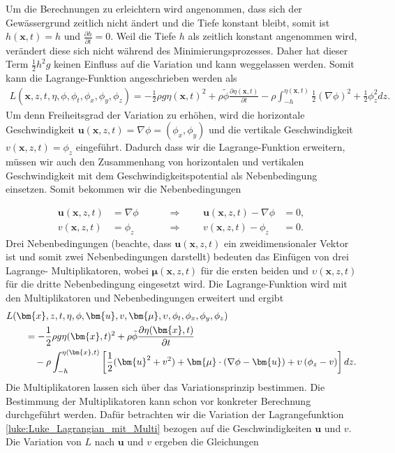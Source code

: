 Um die Berechnungen zu erleichtern wird angenommen, dass sich der Gewässergrund zeitlich nicht ändert und die Tiefe konstant bleibt, somit ist $h(\bm{x},t) = h$ und $\frac{\partial h}{\partial t} = 0$.
Weil die Tiefe $h$ als zeitlich konstant angenommen wird, verändert diese sich nicht während des Minimierungsprozesses.
Daher hat dieser Term $\frac{1}{2}h^2g$ keinen Einfluss auf die Variation und kann weggelassen werden.
Somit kann die Lagrange-Funktion angeschrieben werden als
\begin{align}
	L(\bm{x},z,t,\eta,\phi,\phi_t,\phi_x, \phi_y, \phi_z)
	= 
	-\frac{1}{2}\rho g\eta(\bm{x},t)^2 +\rho \tilde{\phi} \frac{\partial\eta(\bm{x},t)}{\partial t} -\rho \int_{-h}^{\eta(\bm{x},t)} \frac{1}{2}\left(\nabla\phi\right)^2 + \frac{1}{2}\phi_z^2 dz
	.
	\nonumber
\end{align}
Um denn Freiheitsgrad der Variation zu erhöhen, wird die horizontale Geschwindigkeit $\bm{u}(\bm{x},z,t) = \nabla\phi = (\phi_x, \phi_y)$ und die vertikale Geschwindigkeit $v(\bm{x},z,t) = \phi_z$ eingeführt. 
Dadurch dass wir die Lagrange-Funktion erweitern, müssen wir auch den Zusammenhang von horizontalen und vertikalen Geschwindigkeit mit dem Geschwindigkeitspotential als Nebenbedingung einsetzen.
Somit bekommen wir die Nebenbedingungen

\begin{align}
	\bm{u}(\bm{x},z,t)
	&=
	\nabla\phi
	&&&&\Rightarrow&&&
	\bm{u}(\bm{x},z,t)
	-
	\nabla\phi
	&=
	0,
	\nonumber
	\\
	v(\bm{x},z,t)
	&=
	\phi_z
	&&&&\Rightarrow&&&
	v(\bm{x},z,t)
	-
	\phi_z
	&=
	0.
	\nonumber
\end{align}
Drei Nebenbedingungen (beachte, dass $\bm{u}(\bm{x},z,t)$ ein zweidimensionaler Vektor ist und somit zwei Nebenbedingungen darstellt) bedeuten das Einfügen von drei Lagrange- Multiplikatoren, wobei $\bm{\mu}(\bm{x},z,t)$ für die ersten beiden und $\upsilon(\bm{x},z,t)$ für die dritte Nebenbedingung eingesetzt wird.
Die Lagrange-Funktion wird mit den Multiplikatoren und Nebenbedingungen erweitert und ergibt
\begin{align}
&L(\bm{x},z,t,\eta,\phi,\bm{u}, v, \bm{\mu},\upsilon,\phi_t,\phi_x,\phi_y,\phi_z)
\notag
\\
&\qquad=
	-
	\frac{1}{2}\rho  g \eta(\bm{x},t)^2
	+
	\rho \tilde{\phi} \frac{\partial\eta(\bm{x},t)}{\partial t}
	\notag
\\
&\qquad\quad
	-
	\rho \int_{-h}^{\eta(\bm{x},t)} \left[ \frac{1}{2} (\bm{u}^2 + v^2) + \bm{\mu} \cdot (\nabla\phi - \bm{u}) + \upsilon  \left(\phi_z - v\right) \right] dz.
	\label{luke:Luke_Lagrangian_mit_Multi}
\end{align}
Die Multiplikatoren lassen sich über das Variationsprinzip bestimmen.
Die Bestimmung der Multiplikatoren kann schon vor konkreter Berechnung durchgeführt werden.
Dafür betrachten wir die Variation der Lagrangefunktion \eqref{luke:Luke_Lagrangian_mit_Multi} bezogen auf die Geschwindigkeiten $\bm{u}$ und $v$.
Die Variation von $L$ nach $\bm{u}$ und $v$ ergeben die Gleichungen

